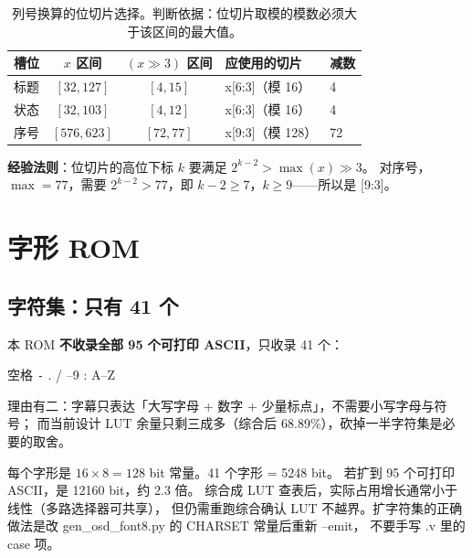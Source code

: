 \documentclass[10pt,a4paper]{article}
\newcommand{\sig}[1]{{\ttfamily\small #1}}
\newcommand{\code}[1]{{\ttfamily\small #1}}
\begin{document}
\begin{table}[htbp]
\centering\small
\caption{列号换算的位切片选择。判断依据：位切片取模的模数必须大于该区间的最大值。}
\label{tab:bitslice}
\renewcommand{\arraystretch}{1.25}
\begin{tabular}{@{}l c c l l@{}}
\toprule
\textbf{槽位} & \textbf{$x$ 区间} & \textbf{$(x\gg3)$ 区间} & \textbf{应使用的切片} & \textbf{减数}\\
\midrule
标题 & $[32,127]$  & $[4,15]$  & \code{x[6:3]}（模 16） & 4\\
状态 & $[32,103]$  & $[4,12]$  & \code{x[6:3]}（模 16） & 4\\
序号 & $[576,623]$ & $[72,77]$ & \code{x[9:3]}（模 128）& 72\\
\bottomrule
\end{tabular}
\end{table}

\textbf{经验法则}：位切片的高位下标 $k$ 要满足 $2^{k-2} > \max(x)\gg3$。
对序号，$\max=77$，需要 $2^{k-2}>77$，即 $k-2\ge7$，$k\ge9$——所以是 \code{[9:3]}。

\section{字形 ROM}
\label{sec:font}

\subsection{字符集：只有 41 个}

本 ROM \textbf{不收录全部 95 个可打印 ASCII}，只收录 41 个：

\begin{center}\small
\textsf{空格} \quad \texttt{-} \quad . \quad / --9 \quad : \quad A--Z
\end{center}

理由有二：字幕只表达「大写字母 + 数字 + 少量标点」，不需要小写字母与符号；
而当前设计 LUT 余量只剩三成多（综合后 68.89\%），砍掉一半字符集是必要的取舍。

\begin{dsnote}
每个字形是 $16\times8=128$ bit 常量。41 个字形 = 5248 bit。
若扩到 95 个可打印 ASCII，是 12160 bit，约 2.3 倍。
综合成 LUT 查表后，实际占用增长通常小于线性（多路选择器可共享），
但仍需重跑综合确认 LUT 不越界。扩字符集的正确做法是改
\sig{gen\_osd\_font8.py} 的 \sig{CHARSET} 常量后重新 \code{--emit}，
不要手写 \sig{.v} 里的 \code{case} 项。
\end{dsnote}
\end{document}

